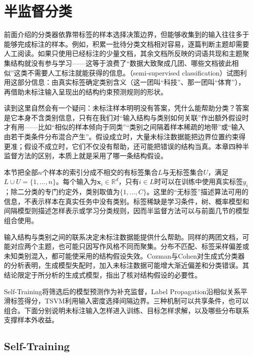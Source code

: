 \section{半监督分类}
\label{sec:classification-semisupervised}

前面介绍的分类器依靠带标签的样本选择决策边界，但能够收集到的输入往往多于能够完成标注的样本。例如，积累一批待分类文档相对容易，逐篇判断主题却需要人工阅读。如果只使用已经标注的少量文档，其余文档所反映的词语共现和主题聚集结构就没有参与学习——这等于浪费了“数据大致聚成几团、哪些文档彼此相似”这类不需要人工标注就能获得的信息。（semi-supervised classification）试图利用这部分信息：由真实标签确定类别含义（这一团叫“科技”、那一团叫“体育”），再借助未标注输入呈现出的结构约束预测规则的形状。

读到这里自然会有一个疑问：未标注样本明明没有答案，凭什么能帮助分类？答案是它本身不含类别信息，只有在我们对“输入结构与类别如何关联”作出额外假设时才有用——比如“相似的样本倾向于同类”“类别之间隔着样本稀疏的地带”或“输入由若干类条件分布混合产生”。假设成立时，大量未标注数据能把边界位置约束得更准；假设不成立时，它们不仅没有帮助，还可能把错误的结构当真。本章四种半监督方法的区别，本质上就是采用了哪一条结构假设。

本节把全部$n$个样本的索引分成不相交的有标签集合$L$与无标签集合$U$，满足$L\cup U=\{1,\dots,n\}$。每个输入为$\bm{x}_i\in\mathbb{R}^{d}$，只有$i\in L$时可以在训练中使用真实标签$y_i$；除二分类的专门约定外，类别取值为$\{1,\dots,C\}$。这里的“无标签”描述算法可用的信息，不表示样本在真实任务中没有类别。标签稀缺是学习条件，树、概率模型和间隔模型则描述怎样表示或学习分类规则，因而半监督方法可以与前面几节的模型组合使用。

输入结构与类别之间的联系决定未标注数据能提供什么帮助。同样的两团文档，可能对应两个主题，也可能只因写作风格不同而聚集。分布不匹配、标签采样偏差或未知类别混入，都可能使采用的结构假设失效。Cozman与Cohen对生成式分类器的分析表明，生成模型失配时，加入未标注数据可能增大渐近偏差和分类错误。其结论限定于所分析的生成式模型，指出了核对结构假设的必要性。

Self-Training将筛选后的模型预测作为补充监督，Label Propagation沿相似关系平滑标签得分，TSVM利用输入密度选择间隔边界。三种机制可以共享条件，也可以组合。下面分别说明未标注输入怎样进入训练、目标怎样求解，以及哪些分布联系支撑样本外收益。

\subsection{Self-Training}
\label{sec:classification-self-training}

